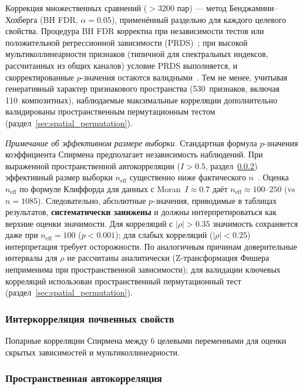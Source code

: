 Коррекция множественных сравнений ($>$3200 пар) --- метод Бенджамини--Хохберга (BH FDR, $\alpha = 0.05$), применённый раздельно для каждого целевого свойства. Процедура BH FDR корректна при независимости тестов или положительной регрессионной зависимости (PRDS)~\citep{Benjamini2001}; при высокой мультиколлинеарности признаков (типичной для спектральных индексов, рассчитанных из общих каналов) условие PRDS выполняется, и скорректированные $p$-значения остаются валидными~\citep{Benjamini2001}. Тем не менее, учитывая генеративный характер признакового пространства (530~признаков, включая 110~композитных), наблюдаемые максимальные корреляции дополнительно валидированы пространственным пермутационным тестом (раздел~\ref{sec:spatial_permutation}).

\textit{Примечание об эффективном размере выборки.} Стандартная формула $p$-значения коэффициента Спирмена предполагает независимость наблюдений. При выраженной пространственной автокорреляции ($I > 0.5$, раздел~\ref{sec:morans_method}) эффективный размер выборки $n_{\text{eff}}$ существенно ниже фактического $n$~\citep{Clifford1989, Dutilleul1993}. Оценка $n_{\text{eff}}$ по формуле Клиффорда для данных с Moran~$I \approx 0.7$ даёт $n_{\text{eff}} \approx 100$--$250$ (vs $n = 1085$). Следовательно, абсолютные $p$-значения, приводимые в таблицах результатов, \textbf{систематически занижены} и должны интерпретироваться как верхние оценки значимости. Для корреляций с $|\rho| > 0.35$ значимость сохраняется даже при $n_{\text{eff}} = 100$ ($p < 0.001$); для слабых корреляций ($|\rho| < 0.25$) интерпретация требует осторожности. По аналогичным причинам доверительные интервалы для $\rho$ не рассчитаны аналитически (Z-трансформация Фишера неприменима при пространственной зависимости); для валидации ключевых корреляций использован пространственный пермутационный тест (раздел~\ref{sec:spatial_permutation}).

\subsubsection{Интеркорреляция почвенных свойств}

Попарные корреляции Спирмена между 6 целевыми переменными для оценки скрытых зависимостей и мультиколлинеарности.

\subsubsection{Пространственная автокорреляция}
\label{sec:morans_method}

